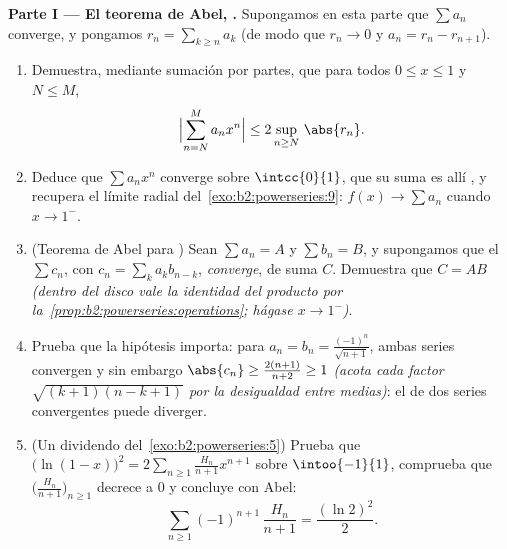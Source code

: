 \begin{problem}
\medskip
\noindent\textbf{Parte I --- El teorema de Abel, .}
Supongamos en esta parte que $\sum a_n$ converge, y pongamos $r_n =
\sum_{k\geq n} a_k$ (de modo que $r_n \to 0$ y $a_n = r_n -
r_{n+1}$).
\begin{enumerate}
  \item Demuestra, mediante sumación por partes, que para todos $0
        \leq x \leq 1$ y $N \leq M$,
        \[
        \Bigl|\sum_{n=N}^{M} a_n x^n\Bigr|
        \leq 2\sup_{n \geq N}\,\abs{r_n} .
        \]
  \item Deduce que $\sum a_nx^n$ converge \emph{}
        sobre $\intcc{0}{1}$, que su suma es allí , y
        recupera el límite radial del~\cref{exo:b2:powerseries:9}:
        $f(x) \to \sum a_n$ cuando $x \to 1^-$.
  \item (Teorema de Abel para ) Sean $\sum a_n =
        A$ y $\sum b_n = B$, y supongamos que el 
        $\sum c_n$, con $c_n = \sum_{k} a_kb_{n-k}$,
        \emph{converge}, de suma $C$. Demuestra que $C = AB$
        \emph{(dentro del disco vale la identidad del producto por
        la~\cref{prop:b2:powerseries:operations}; hágase $x \to
        1^-$)}.
  \item Prueba que la hipótesis importa: para $a_n = b_n =
        \frac{(-1)^n}{\sqrt{n+1}}$, ambas series convergen y sin
        embargo $\abs{c_n} \geq \frac{2(n+1)}{n+2} \geq 1$
        \emph{(acota cada factor $\sqrt{(k+1)(n-k+1)}$ por la
        desigualdad entre medias)}: el  de dos
        series convergentes puede diverger.
  \item (Un dividendo del~\cref{exo:b2:powerseries:5}) Prueba que
        $\bigl(\ln(1-x)\bigr)^2 = 2\sum_{n\geq1}
        \frac{H_n}{n+1}x^{n+1}$ sobre $\intoo{-1}{1}$, comprueba
        que $\bigl(\frac{H_n}{n+1}\bigr)_{n\geq1}$ decrece a $0$ y
        concluye con Abel:
        \[
        \sum_{n\geq1} (-1)^{n+1}\,\frac{H_n}{n+1}
        = \frac{(\ln 2)^2}{2} .
        \]
\end{enumerate}


\end{problem}
